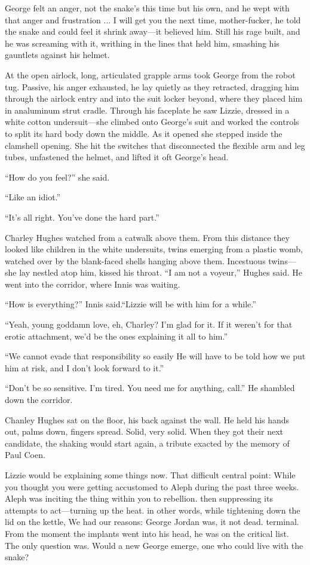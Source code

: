 George felt an anger, not the snake's this time but his own, and he wept with that anger and frustration ... I will get you the next time, mother-fucker, he told the snake and could feel it shrink away—it believed him. Still his rage built, and he was screaming with it, writhing in the lines that held him, smashing his gauntlets against his helmet.

At the open airlock, long, articulated grapple arms took George from the robot tug. Passive, his anger exhausted, he lay quietly as they retracted, dragging him through the airlock entry and into the suit locker beyond, where they placed him in analuminum strut cradle. Through his faceplate he saw Lizzie, dressed in a white cotton undersuit—she climbed onto George's suit and worked the controls to split its hard body down the middle. As it opened she stepped inside the clamshell opening. She hit the switches that disconnected the flexible arm and leg tubes, unfastened the helmet, and lifted it oft George's head.

``How do you feel?'' she said.

``Like an idiot.''

``It's all right. You've done the hard part.''

Charley Hughes watched from a catwalk above them. From this distance they looked like children in the white undersuits, twins emerging from a plastic womb, watched over by the blank-faced shells hanging above them. Incestuous twins—she lay nestled atop him, kissed his throat. ``I am not a voyeur,'' Hughes said. He went into the corridor, where Innis was waiting.

``How is everything?'' Innis said.``Lizzie will be with him for a while.''

``Yeah, young goddamn love, eh, Charley? I'm glad for it. If it weren't for that erotic attachment, we'd be the ones explaining it all to him.''

``We cannot evade that responsibility so easily He will have to be told how we put him at risk, and I don't look forward to it.''

``Don't be so sensitive. I'm tired. You need me for anything, call.'' He shambled down the corridor.

Chanley Hughes sat on the floor, his back against the wall. He held his hands out, palms down, fingers spread. Solid, very solid. When they got their next candidate, the shaking would start again, a tribute exacted by the 
memory of Paul Coen.

Lizzie would be explaining some things now. That difficult central point: While you thought you were getting accustomed to Aleph during the past three weeks. Aleph was inciting the thing within you to rebellion. then suppressing its attempts to act—turning up the heat. in other words, while tightening down the lid on the kettle, We had our reasons: George Jordan was, it not dead. terminal. From the moment the implants went into his head, he was on the critical list. The only question was. Would a new George emerge, one who could live with the snake?

